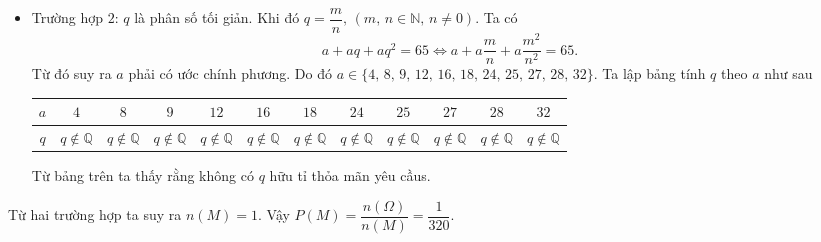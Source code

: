 \begin{bt}
{\begin{itemize}
\begin{itemize}
				\item Nếu $a=13$ ta được 
				$$1+q+q^2=5\Leftrightarrow \hoac{&q=\dfrac{-1+\sqrt{17}}{2}\\&q=\dfrac{-1-\sqrt{17}}{2}.}$$
				Vì cả hai nghiệm $q$ đều không nguyên nên ta loại trường hợp này
			\end{itemize} 
			\item Trường hợp $2$: $q$ là phân số tối giản. Khi đó $q=\dfrac{m}{n},\,(m,\,n\in \mathbb{N},\,n\neq 0)$. Ta có
			$$a+aq+aq^2=65\Leftrightarrow a+a\dfrac{m}{n}+a\dfrac{m^2}{n^2}=65.$$
			Từ đó suy ra $a$ phải có ước chính phương. Do đó $a\in\{4,\,8,\,9,\,12,\,16,\,18,\,24,\,25,\,27,\,28,\,32\}$. Ta lập bảng tính $q$ theo $a$ như sau
			\begin{center}
				\renewcommand{\arraystretch}{1.5}
				\begin{tabular}{|c|c|c|c|c|c|c|c|c|c|c|c|}
					\hline
					$a$&$4$&$8$&$9$&$12$&$16$&$18$&$24$&$25$&$27$&$28$&$32$\\
					\hline
					$q$&$q\notin \mathbb{Q}$&$q\notin \mathbb{Q}$&$q\notin \mathbb{Q}$&$q\notin \mathbb{Q}$&$q\notin \mathbb{Q}$&$q\notin \mathbb{Q}$&$q\notin \mathbb{Q}$&$q\notin \mathbb{Q}$&$q\notin \mathbb{Q}$&$q\notin \mathbb{Q}$&$q\notin \mathbb{Q}$\\
					\hline
				\end{tabular}
				\renewcommand{\arraystretch}{1}
			\end{center}
			\noindent
			Từ bảng trên ta thấy rằng không có $q$ hữu tỉ thỏa mãn yêu cầus.
		\end{itemize}
		Từ hai trường hợp ta suy ra $n(M)=1$. Vậy $P(M)=\dfrac{n(\Omega)}{n(M)}=\dfrac{1}{320}$.}
\end{bt}

